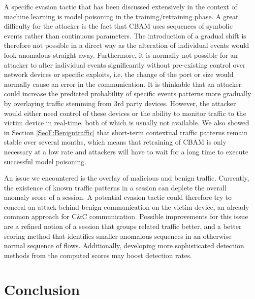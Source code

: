 A specific evasion tactic that has been discussed extensively in the context of machine learning is model poisoning in the training/retraining phase. A great difficulty for the attacker is the fact that CBAM uses sequences of symbolic events rather than continuous parameters. The introduction of a gradual shift is therefore not possible in a direct way as the alteration of individual events would look anomalous straight away. Furthermore, it is normally not possible for an attacker to alter individual events significantly without pre-existing control over network devices or specific exploits, i.e. the change of the port or size would normally cause an error in the communication. It is thinkable that an attacker could increase the predicted probability of specific events patterns more gradually by overlaying traffic stemming from 3rd party devices. However, the attacker would either need control of these devices or the ability to monitor traffic to the victim device in real-time, both of which is usually not available.
We also showed in Section \ref{SecF:Benigntraffic} that short-term contextual traffic patterns remain stable over several months, which means that retraining of CBAM is only necessary at a low rate and attackers will have to wait for a long time to execute successful model poisoning.




An issue we encountered is the overlay of malicious and benign traffic. Currently, the existence of known traffic patterns in a session can deplete the overall anomaly score of a session. A potential evasion tactic could therefore try to conceal an attack behind benign communication on the victim device, an already common approach for C\&C communication. Possible improvements for this issue are a refined notion of a session that groups related traffic better, and a better scoring method that identifies smaller anomalous sequences in an otherwise normal sequence of flows. Additionally, developing more sophisticated detection methods from the computed scores may boost detection rates.



\section{Conclusion}\label{SecF:flaws}


